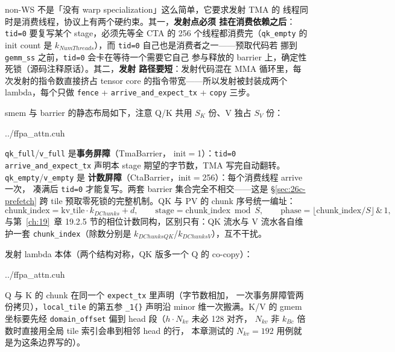 non-WS 不是「没有 warp specialization」这么简单，它要求发射 TMA 的
线程同时是消费线程，协议上有两个硬约束。其一，\textbf{发射点必须
挂在消费依赖之后}：\texttt{tid=0} 要复写某个 stage，必须先等全 CTA 的
256 个线程都消费完（\texttt{qk\_empty} 的 init count 是
$k_{NumThreads}$），而 \texttt{tid=0} 自己也是消费者之一——预取代码若
挪到 \texttt{gemm\_ss} 之前，\texttt{tid=0} 会卡在等待一个需要它自己
参与释放的 barrier 上，确定性死锁（源码注释原话）。其二，\textbf{发射
路径要短}：发射代码混在 MMA 循环里，每次发射的指令数直接挤占
tensor core 的指令带宽——所以发射被封装成两个 lambda，每个只做
\texttt{fence} + \texttt{arrive\_and\_expect\_tx} + \texttt{copy} 三步。

smem 与 barrier 的静态布局如下，注意 Q/K 共用 $S_K$ 份、V 独占
$S_V$ 份：

\begin{lstinputlisting}[linerange={880-913},firstnumber=auto,
  title={ffpa\_attn.cuh L880-913（smem 三段池；full/empty 双 barrier 集初始化）}]{../ffpa_attn.cuh}
\end{lstinputlisting}

\texttt{qk\_full}/\texttt{v\_full} 是\textbf{事务屏障}（TmaBarrier，
init$=$1）：\texttt{tid=0} \texttt{arrive\_and\_expect\_tx} 声明本 stage
期望的字节数，TMA 写完自动翻转。\texttt{qk\_empty}/\texttt{v\_empty} 是
\textbf{计数屏障}（CtaBarrier，init$=$256）：每个消费线程 arrive 一次，
凑满后 \texttt{tid=0} 才能复写。两套 barrier 集合完全不相交——这是
\S\ref{sec:26c-prefetch} 跨 tile 预取零死锁的完整机制。QK 与 PV 的
chunk 序号统一编址：
\begin{equation}\label{eq:26c-phase}
  \text{chunk\_index} = \text{kv\_tile} \cdot k_{DChunks} + d,\qquad
  \text{stage} = \text{chunk\_index} \bmod S,\qquad
  \text{phase} = \big\lfloor \text{chunk\_index}/S \big\rfloor \,\&\,1,
\end{equation}
与第~\ref{ch:19}~章 19.2.5 节的相位计数同构，区别只有：QK 流水与
V 流水各自维护一套 \texttt{chunk\_index}（除数分别是
$k_{DChunksQK}$/$k_{DChunksV}$），互不干扰。

发射 lambda 本体（两个结构对称，QK 版多一个 Q 的 co-copy）：

\begin{lstinputlisting}[linerange={975-1006},firstnumber=auto,
  title={ffpa\_attn.cuh L975-1006（\texttt{issue\_qk\_tma}/\texttt{issue\_v\_tma}：tid=0 内联发射）}]{../ffpa_attn.cuh}
\end{lstinputlisting}

Q 与 K 的 chunk 在同一个 \texttt{expect\_tx} 里声明（字节数相加，
一次事务屏障管两份拷贝），\texttt{local\_tile} 的第五参 \texttt{\_1\{\}}
声明沿 minor 维一次搬满。K/V 的 gmem 坐标要先经
\texttt{domain\_offset} 偏到 head 段（$h \cdot N_{kv}$ 未必 128 对齐，
$N_{kv}$ 非 $k_{Bc}$ 倍数时直接用全局 tile 索引会串到相邻 head 的行，
本章测试的 $N_{kv}{=}192$ 用例就是为这条边界写的）。

